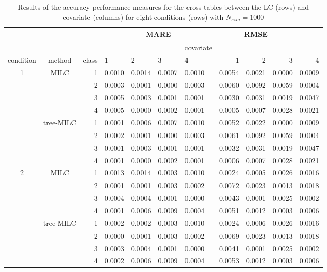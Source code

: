 \documentclass[a4paper, 11pt]{article} %
\begin{document}
\newpage
\begin{table}[ht] 
\centering
\scriptsize
\caption{Results of the accuracy performance measures for the cross-tables between the LC (rows) and covariate (columns) for eight conditions (rows) with $N_{sim}=1000$}
\label{COVaccuracyresults}
\begin{tabular}{cc r llll  rrrr }
  \hline
&& &\multicolumn{4}{c}{MARE}&\multicolumn{3}{c}{RMSE}\\ 
 \hline
   &  &          &&&&  covariate  &&&\\
   \hline
   condition & method & class      & 1&2&3&4  &      1&2&3&4 \\ 

  \hline
  \multirow{8}{*}{1}
   & \multirow{4}{*}{MILC}
&  1
  & 0.0010 & 0.0014 & 0.0007 & 0.0010 
& 0.0054 & 0.0021 & 0.0000 & 0.0009 \\ 
 && 2 
 & 0.0003 & 0.0001 & 0.0000 & 0.0003
& 0.0060 & 0.0092 & 0.0059 & 0.0004 \\ 
  &&3
  & 0.0005 & 0.0003 & 0.0001 & 0.0001 
 & 0.0030 & 0.0031 & 0.0019 & 0.0047 \\  
  &&4
  & 0.0005 & 0.0000 & 0.0002 & 0.0001 
  & 0.0005 & 0.0007 & 0.0028 & 0.0021 \\ 
 \cline{2-11}
   & \multirow{4}{*}{tree-MILC}
   &1
& 0.0001 & 0.0006 & 0.0007 & 0.0010 
& 0.0052 & 0.0022 & 0.0000 & 0.0009 \\
  &&2
& 0.0002 & 0.0001 & 0.0000 & 0.0003
& 0.0061 & 0.0092 & 0.0059 & 0.0004 \\ 
  &&3 
& 0.0001 & 0.0003 & 0.0001 & 0.0001
& 0.0032 & 0.0031 & 0.0019 & 0.0047 \\ 
  &&4 
& 0.0001 & 0.0000 & 0.0002 & 0.0001 
& 0.0006 & 0.0007 & 0.0028 & 0.0021 \\ 
    \hline
    \hline
  \multirow{8}{*}{2}
   & \multirow{4}{*}{MILC}
&  1
 & 0.0013 & 0.0014 & 0.0003 & 0.0010  
 & 0.0024 & 0.0005 & 0.0026 & 0.0016 \\ 
 && 2 
 & 0.0001 & 0.0001 & 0.0003 & 0.0002
& 0.0072 & 0.0023 & 0.0013 & 0.0018 \\ 
&&3
& 0.0004 & 0.0004 & 0.0001 & 0.0000 
 & 0.0043 & 0.0001 & 0.0025 & 0.0002 \\   &&4
& 0.0001 & 0.0006 & 0.0009 & 0.0004
& 0.0051 & 0.0012 & 0.0003 & 0.0006 \\  \cline{2-11}
   & \multirow{4}{*}{tree-MILC}
   &1
& 0.0002 & 0.0002 & 0.0003 & 0.0010
& 0.0024 & 0.0006 & 0.0026 & 0.0016 \\ 
  &&2
& 0.0000 & 0.0001 & 0.0003 & 0.0002
& 0.0069 & 0.0023 & 0.0013 & 0.0018 \\  
  &&3 
& 0.0003 & 0.0004 & 0.0001 & 0.0000
  & 0.0041 & 0.0001 & 0.0025 & 0.0002 \\ 
  &&4 
& 0.0002 & 0.0006 & 0.0009 & 0.0004
 & 0.0053 & 0.0012 & 0.0003 & 0.0006 \\ 


\end{tabular}
\end{table}
\end{document}
